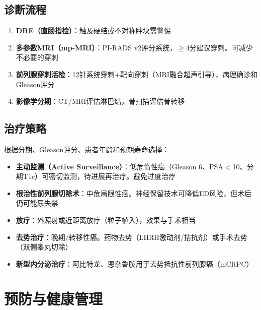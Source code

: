 \documentclass[12pt,a4paper,twoside]{ctexbook}
\begin{document}
\subsection{诊断流程}

\begin{enumerate}
	\item \textbf{DRE（直肠指检）}：触及硬结或不对称肿块需警惕
	\item \textbf{多参数MRI（mp-MRI）}：PI-RADS v2评分系统，$\geq$4分建议穿刺。可减少不必要的穿刺
	\item \textbf{前列腺穿刺活检}：12针系统穿刺+靶向穿刺（MRI融合超声引导），病理确诊和Gleason评分
	\item \textbf{影像学分期}：CT/MRI评估淋巴结，骨扫描评估骨转移
\end{enumerate}

\subsection{治疗策略}

根据分期、Gleason评分、患者年龄和预期寿命选择：

\begin{itemize}[leftmargin=2cm]
	\item \textbf{主动监测（Active Surveillance）}：低危惰性癌（Gleason 6、PSA$<$10、分期T1c）可密切监测，待进展再治疗。避免过度治疗
	\item \textbf{根治性前列腺切除术}：中危局限性癌。神经保留技术可降低ED风险，但术后仍可能尿失禁
	\item \textbf{放疗}：外照射或近距离放疗（粒子植入），效果与手术相当
	\item \textbf{去势治疗}：晚期/转移性癌。药物去势（LHRH激动剂/拮抗剂）或手术去势（双侧睾丸切除）
	\item \textbf{新型内分泌治疗}：阿比特龙、恩杂鲁胺用于去势抵抗性前列腺癌（mCRPC）
\end{itemize}

\section{预防与健康管理}
\end{document}
